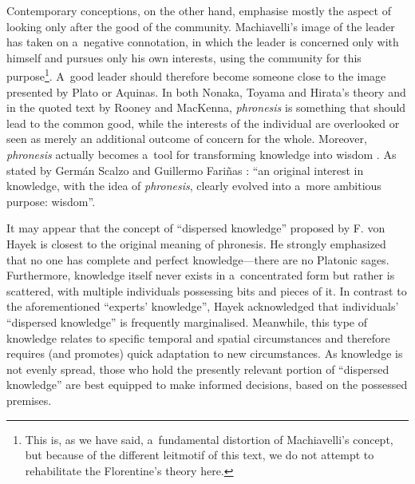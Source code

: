 Contemporary conceptions, on the other hand, emphasise mostly the aspect of looking only after the good of the community. Machiavelli's image of the leader has taken on a~negative connotation, in which the leader is concerned only with himself and pursues only his own interests, using the community for this purpose\footnote{This is, as we have said, a~fundamental distortion of Machiavelli's concept, but because of the different leitmotif of this text, we do not attempt to rehabilitate the Florentine's theory here.}. A~good leader should therefore become someone close to the image presented by Plato or Aquinas. In both Nonaka, Toyama and Hirata's theory and in the quoted text by Rooney and MacKenna, \textit{phronesis} is something that should lead to the common good, while the interests of the individual are overlooked or seen as merely an additional outcome of concern for the whole. Moreover, \textit{phronesis} actually becomes a~tool for transforming knowledge into wisdom 
\parencite[][p.67]{nonaka_managing_2008}. %
 As stated by Germán Scalzo and Guillermo Fariñas 
\parencite*[][p.30]{}: %
 ``an original interest in knowledge, with the idea of \textit{phronesis}, clearly evolved into a~more ambitious purpose: wisdom''.



It may appear that the concept of ``dispersed knowledge'' proposed by F. von Hayek 
\parencite*[][]{hayek_use_1945} %
 is closest to the original meaning of phronesis. He strongly emphasized that no one has complete and perfect knowledge---there are no Platonic sages. Furthermore, knowledge itself never exists in a~concentrated form but rather is scattered, with multiple individuals possessing bits and pieces of it. In contrast to the aforementioned ``experts' knowledge'', Hayek acknowledged that individuals' ``dispersed knowledge'' is frequently marginalised. Meanwhile, this type of knowledge relates to specific temporal and spatial circumstances and therefore requires (and promotes) quick adaptation to new circumstances. As knowledge is not evenly spread, those who hold the presently relevant portion of ``dispersed knowledge'' are best equipped to make informed decisions, based on the possessed premises.



